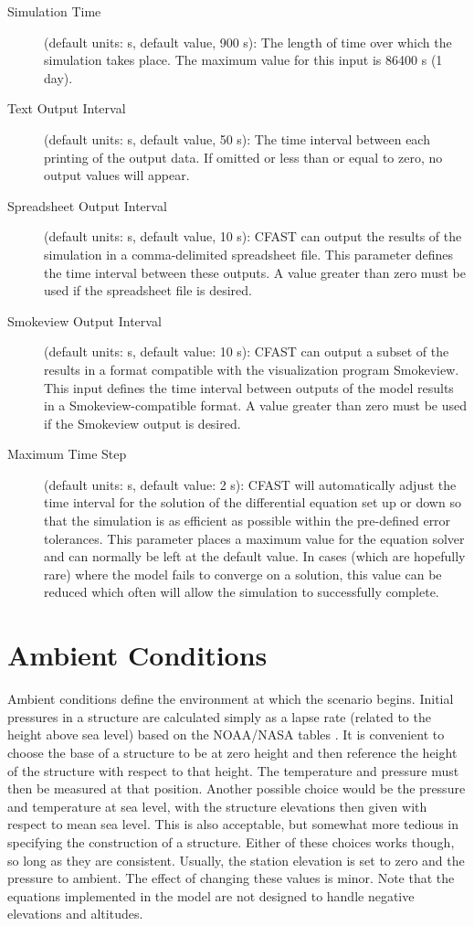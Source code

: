 \begin{description}
\item[Simulation Time] (default units: s, default value, 900 s): The length of time over which the simulation takes place. The maximum value for this input is 86400 s (1 day).

\item[Text Output Interval] (default units: s, default value, 50 s): The time interval between each printing of the output data.  If omitted or less than or equal to zero, no output values will appear.

\item[Spreadsheet Output Interval] (default units: s, default value, 10 s): CFAST can output the results of the simulation in a comma-delimited spreadsheet file. This parameter defines the time interval between these outputs. A value greater than zero must be used if the spreadsheet file is desired.

\item[Smokeview Output Interval] (default units: s, default value: 10 s): CFAST can output a subset of the results in a format compatible with the visualization program Smokeview. This input defines the time interval between outputs of the model results in a Smokeview-compatible format.  A value greater than zero must be used if the Smokeview output is desired.

\item[Maximum Time Step] (default units: s, default value: 2 s): CFAST will automatically adjust the time interval for the solution of the differential equation set up or down so that the simulation is as efficient as possible within the pre-defined error tolerances. This parameter places a maximum value for the equation solver and can normally be left at the default value. In cases (which are hopefully rare) where the model fails to converge on a solution, this value can be reduced which often will allow the simulation to successfully complete.
\end{description}

\section{Ambient Conditions}

Ambient conditions define the environment at which the scenario begins. Initial pressures in a structure are calculated simply as a lapse rate (related to the height above sea level) based on the NOAA/NASA tables \cite{GPO:Atmosphere}. It is convenient to choose the base of a structure to be at zero height and then reference the height of the structure with respect to that height.  The temperature and pressure must then be measured at that position.  Another possible choice would be the pressure and temperature at sea level, with the structure elevations then given with respect to mean sea level.  This is also acceptable, but somewhat more tedious in specifying the construction of a structure.  Either of these choices works though, so long as they are consistent. Usually, the station elevation is set to zero and the pressure to ambient. The effect of changing these values is minor. Note that the equations implemented in the model are not designed to handle negative elevations and altitudes.

